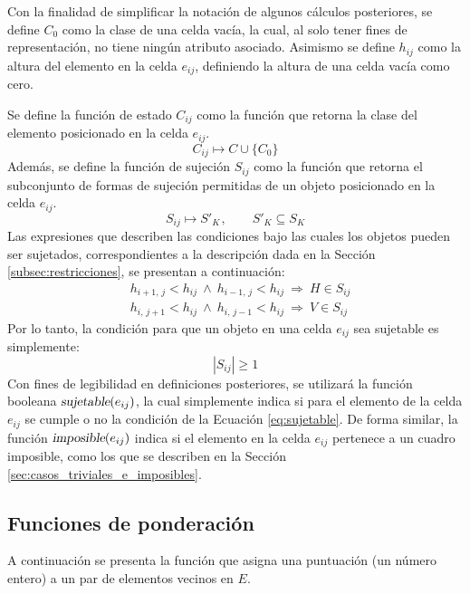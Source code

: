 Con la finalidad de simplificar la notación de algunos cálculos posteriores, se define $C_0$ como la clase de una celda vacía, la cual, al solo tener fines de representación, no tiene ningún atributo asociado.
Asimismo se define $h_{ij}$ como la altura del elemento en la celda $e_{ij}$, definiendo la altura de una celda vacía como cero.

Se define la función de estado $C_{ij}$ como la función que retorna la clase del elemento posicionado en la celda $e_{ij}$.
%
\begin{equation}
	C_{ij} \mapsto C \cup \{ C_0 \}
\end{equation}
%
Además, se define la función de sujeción $S_{ij}$ como la función que retorna el subconjunto de formas de sujeción permitidas de un objeto posicionado en la celda $e_{ij}$.
%
\begin{equation}
	S_{ij} \mapsto S'_K \hspace{1pt}, \qquad S'_K \subseteq S_K
\end{equation}
%
Las expresiones que describen las condiciones bajo las cuales los objetos pueden ser sujetados, correspondientes a la descripción dada en la Sección \ref{subsec:restricciones}, se presentan a continuación:
%	
\begin{equation}
\label{eq:restricciones}
	\begin{aligned}
		&h_{i+1,\, j} < h_{ij}\ \wedge\ h_{i-1,\, j} < h_{ij}\ \Rightarrow\ H \in S_{ij} \\[0.7em]
		&h_{i,\, j+1} < h_{ij}\ \wedge\ h_{i,\, j-1} < h_{ij}\ \Rightarrow\ V \in S_{ij}
	\end{aligned}
\end{equation}
%
Por lo tanto, la condición para que un objeto en una celda $e_{ij}$ sea sujetable es simplemente:
%
\begin{equation}
\label{eq:sujetable}
	|S_{ij}| \geq 1
\end{equation}
%
Con fines de legibilidad en definiciones posteriores, se utilizará la función booleana $\textsl{sujetable}(e_{ij})$, la cual simplemente indica si para el elemento de la celda $e_{ij}$ se cumple o no la condición de la Ecuación \ref{eq:sujetable}.
De forma similar, la función $\textsl{imposible}(e_{ij})$ indica si el elemento en la celda $e_{ij}$ pertenece a un cuadro imposible, como los que se describen en la Sección \ref{sec:casos_triviales_e_imposibles}.
%
%
\subsection{Funciones de ponderación}
\label{subsec:funciones_ponderacion}
%
%
A continuación se presenta la función que asigna una puntuación (un número entero) a un par de elementos vecinos en $E$.

